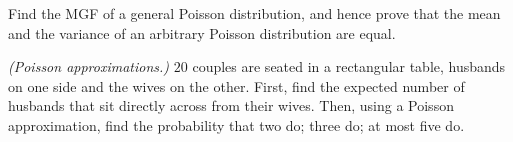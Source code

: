\begin{problem}[Handout 10, \# 14]
  Find the MGF of a general Poisson distribution, and hence prove that the
  mean and the variance of an arbitrary Poisson distribution are equal.
\end{problem}
\begin{solution}

\end{solution}
\newpage

\begin{problem}[Handout 10, \# 17 (a)]
  \emph{(Poisson approximations.)} \(20\) couples are seated in a
  rectangular table, husbands on one side and the wives on the
  other. First, find the expected number of husbands that sit directly
  across from their wives. Then, using a Poisson approximation, find the
  probability that two do; three do; at most five do.
\end{problem}
\begin{solution}

\end{solution}

